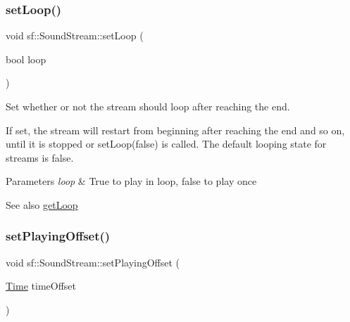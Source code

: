 \mbox{\label{classsf_1_1_sound_stream_a43fade018ffba7e4f847a9f00b353f3d}} 
\subsubsection{\texorpdfstring{setLoop()}{setLoop()}}
{\footnotesize\ttfamily void sf\+::\+Sound\+Stream\+::set\+Loop (\begin{DoxyParamCaption}\item[{bool}]{loop }\end{DoxyParamCaption})}



Set whether or not the stream should loop after reaching the end. 

If set, the stream will restart from beginning after reaching the end and so on, until it is stopped or set\+Loop(false) is called. The default looping state for streams is false.


\begin{DoxyParams}{Parameters}
{\em loop} & True to play in loop, false to play once\\
\hline
\end{DoxyParams}
\begin{DoxySeeAlso}{See also}
\mbox{\hyperlink{classsf_1_1_sound_stream_a49d263f9bbaefec4b019bd05fda59b25}{get\+Loop}} \begin{DoxyVerb}\end{DoxyVerb}
 
\end{DoxySeeAlso}
\mbox{\label{classsf_1_1_sound_stream_af416a5f84c8750d2acb9821d78bc8646}} 
\subsubsection{\texorpdfstring{setPlayingOffset()}{setPlayingOffset()}}
{\footnotesize\ttfamily void sf\+::\+Sound\+Stream\+::set\+Playing\+Offset (\begin{DoxyParamCaption}\item[{\mbox{\hyperlink{classsf_1_1_time}{Time}}}]{time\+Offset }\end{DoxyParamCaption})}



